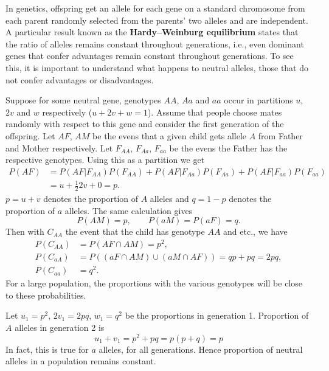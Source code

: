 \documentclass[letter-paper]{tufte-book}
\newenvironment{example}[1][Example]{\begin{trivlist}
\item[\hskip \labelsep {\bfseries #1}]}{\end{trivlist}}
\newcommand\Def[1]{\textbf{#1}}
\begin{document}
\begin{example}[Example: Hardy--Weinburg equilibrium]
  
  In genetics, offspring get an allele for each gene on a standard chromosome
  from each parent randomly selected from the parents' two alleles and are
  independent. A particular result known as the \Def{Hardy--Weinburg
  equilibrium} states that the ratio of alleles remains constant throughout
  generations, i.e., even dominant genes that confer advantages remain constant
  throughout generations. To see this, it is important to understand what
  happens to neutral alleles, those that do not confer advantages or
  disadvantages.
  
  Suppose for some neutral gene, genotypes $AA$, $Aa$ and $aa$ occur in
  partitions $u$, $2v$ and $w$ respectively ($u+2v+w=1$). Assume that people
  choose mates randomly with respect to this gene and consider the first
  generation of the offspring. Let $AF$, $AM$ be the evens that a given child
  gets allele $A$ from Father and Mother respectively. Let $F_{AA}$, $F_{Aa}$,
  $F_{aa}$ be the evens the Father has the respective genotypes. Using this as a
  partition we get
  \begin{align*}
    P(AF) &= P(AF|F_{AA})P(F_{AA})+P(AF|F_{Aa})P(F_{Aa})+P(AF|F_{aa})P(F_{aa})\\
    &= u+\frac{1}{2}2v+0 = p.
  \end{align*}
  $p=u+v$ denotes the proportion of $A$ alleles and $q=1-p$ denotes the
  proportion of $a$ alleles. The same calculation gives
  \begin{equation*}
    P(AM)=p,\qquad P(aM)=P(aF)=q.
  \end{equation*}
  Then with $C_{AA}$ the event that the child has genotype $AA$ and etc., we
  have
  \begin{align*}
    P(C_{AA}) &= P(AF\cap AM) = p^2,\\ 
    P(C_{aA}) &= P((aF\cap AM)\cup (aM\cap AF)) = qp+pq = 2pq,\\
    P(C_{aa}) &= q^2.
  \end{align*}
  For a large population, the proportions with the various genotypes will be
  close to these probabilities.
  
  Let $u_1 = p^2$, $2v_1=2pq$, $w_1=q^2$ be the proportions in generation 1.
  Proportion of $A$ alleles in generation 2 is
  \begin{equation*}
    u_1+v_1=p^2+pq=p(p+q)=p
  \end{equation*}
  In fact, this is true for $a$ alleles, for all generations. Hence proportion
  of neutral alleles in a population remains constant.
\end{example}
\end{document}
